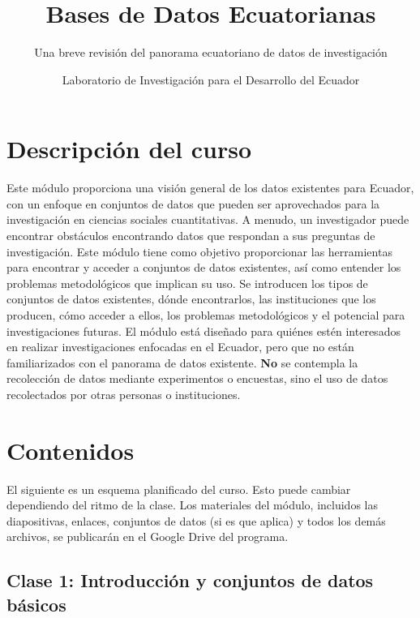 \documentclass[
  letterpaper,
  DIV=11,
  numbers=noendperiod]{scrartcl}
\title{Bases de Datos Ecuatorianas}
\subtitle{Una breve revisión del panorama ecuatoriano de datos de
investigación}
\author{Laboratorio de Investigación para el Desarrollo del Ecuador}
\date{}
\begin{document}
\maketitle

\section{Descripción del curso}\label{descripciuxf3n-del-curso}

Este módulo proporciona una visión general de los datos existentes para
Ecuador, con un enfoque en conjuntos de datos que pueden ser
aprovechados para la investigación en ciencias sociales cuantitativas. A
menudo, un investigador puede encontrar obstáculos encontrando datos que
respondan a sus preguntas de investigación. Este módulo tiene como
objetivo proporcionar las herramientas para encontrar y acceder a
conjuntos de datos existentes, así como entender los problemas
metodológicos que implican su uso. Se introducen los tipos de conjuntos
de datos existentes, dónde encontrarlos, las instituciones que los
producen, cómo acceder a ellos, los problemas metodológicos y el
potencial para investigaciones futuras. El módulo está diseñado para
quiénes estén interesados en realizar investigaciones enfocadas en el
Ecuador, pero que no están familiarizados con el panorama de datos
existente. \textbf{No} se contempla la recolección de datos mediante
experimentos o encuestas, sino el uso de datos recolectados por otras
personas o instituciones.

\section{Contenidos}\label{sec-contents}

El siguiente es un esquema planificado del curso. Esto puede cambiar
dependiendo del ritmo de la clase. Los materiales del módulo, incluidos
las diapositivas, enlaces, conjuntos de datos (si es que aplica) y todos
los demás archivos, se publicarán en el Google Drive del programa.

\subsection{Clase 1: Introducción y conjuntos de datos
básicos}\label{clase-1-introducciuxf3n-y-conjuntos-de-datos-buxe1sicos}
\end{document}
